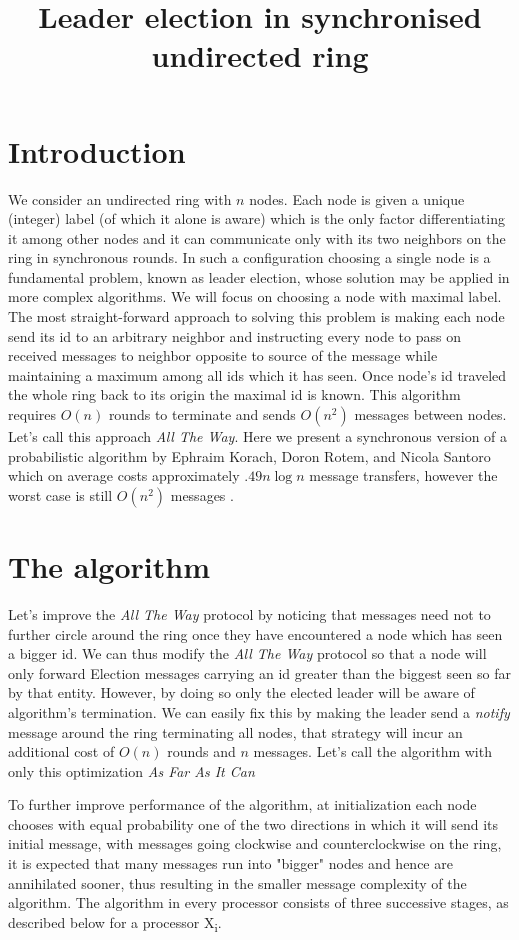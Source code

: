 \documentclass[a4paper,12pt]{article}
\title{Leader election in synchronised undirected ring}
\date{}
\begin{document}
\maketitle
\section{Introduction}
We consider an undirected ring with $n$ nodes. Each node is given a unique (integer) label (of which it alone is aware) which is the only factor differentiating it among other nodes and it can communicate only with its two neighbors on the ring in synchronous rounds. In such a configuration choosing a single node is a fundamental problem, known as leader election, whose solution may be applied in more complex algorithms. We will focus on choosing a node with maximal label.
The most straight-forward approach to solving this problem is making each node send its id to an arbitrary neighbor and instructing every node to pass on received messages to neighbor opposite to source of the message while maintaining a maximum among all ids which it has seen. Once node's id traveled the whole ring back to its origin the maximal id is known. This algorithm requires $O(n)$ rounds to terminate and sends $O(n^2)$ messages between nodes. Let's call this approach \textit{All The Way}. Here we present a synchronous version of a probabilistic algorithm by Ephraim Korach, Doron Rotem, and Nicola Santoro \cite{ROTEM1987575} which on average costs approximately $.49n \log n$ message transfers, however the worst case is still $O(n^2)$ messages .

\section{The algorithm}
Let's improve the \textit{All The Way} protocol by noticing that messages need not to further circle around the ring once they have encountered a node which has seen a bigger id. We can thus modify the \textit{All The Way} protocol so that a node will only forward Election messages carrying an id greater than the biggest seen so far by that entity. However, by doing so only the elected leader will be aware of algorithm's termination. We can easily fix this by making the leader send a \textit{notify} message around the ring terminating all nodes, that strategy will incur an additional cost of $O(n)$ rounds and $n$ messages. Let's call the algorithm with only this optimization \textit{As Far As It Can}

To further improve performance of the algorithm, at initialization each node chooses with equal probability one of the two directions in which it will send its initial message, with messages going clockwise and counterclockwise on the ring, it is expected that many messages run into "bigger" nodes and hence are annihilated sooner, thus resulting in the smaller message complexity of the algorithm. The algorithm in every processor consists of three successive stages, as described below for a processor X\textsubscript{i}.
\end{document}
